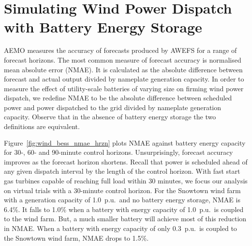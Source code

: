 \documentclass[a4paper, 10pt, twocolumn, preprint, 3p]{elsarticle}
\begin{document}
\section{Simulating Wind Power Dispatch with Battery Energy Storage}\label{sect:sim_wind_dptch_bess}
\begin{figure*}[!t]
	\centering
	\scalebox{1.0}{
		
	}
	\caption[NMAE of wind power dispatch with battery energy storage for control horizons of varying length]{Normalised mean absolute error (NMAE) for the Snowtown wind farm with generation capacity of 1.0~p.u.\ coupled with utility-scale batteries of varying size.  The MPC controller optimises wind power dispatch with battery energy storage over 30-, 60-, and 90-minute prediction/control horizons.  NMAE is calculated as the absolute difference between scheduled power and power dispatched to the grid divided by nameplate generation capacity.} 
	\label{fig:wind_bess_nmae_hrzn}
\end{figure*}

AEMO measures the accuracy of forecasts produced by AWEFS for a range of forecast horizons.  The most common measure of forecast accuracy is normalised mean absolute error (NMAE).  It is calculated as the absolute difference between forecast and actual output divided by nameplate generation capacity.  In order to measure the effect of utility-scale batteries of varying size on firming wind power dispatch, we redefine NMAE to be the absolute difference between scheduled power and power dispatched to the grid divided by nameplate generation capacity.  Observe that in the absence of battery energy storage the two definitions are equivalent.

Figure~\ref{fig:wind_bess_nmae_hrzn} plots NMAE against battery energy capacity for 30-, 60- and 90-minute control horizons.  Unsurprisingly, forecast accuracy improves as the forecast horizon shortens.  Recall that power is scheduled ahead of any given dispatch interval by the length of the control horizon.  With fast start gas turbines capable of reaching full load within 30 minutes, we focus our analysis on virtual trials with a 30-minute control horizon.  For the Snowtown wind farm with a generation capacity of 1.0~p.u.\ and no battery energy storage, NMAE is 6.4\%.  It falls to 1.0\% when a battery with energy capacity of 1.0~p.u.\ is coupled to the wind farm.  But, a much smaller battery will achieve most of this reduction in NMAE.  When a battery with energy capacity of only 0.3~p.u.\ is coupled to the Snowtown wind farm, NMAE drops to 1.5\%.
\end{document}
